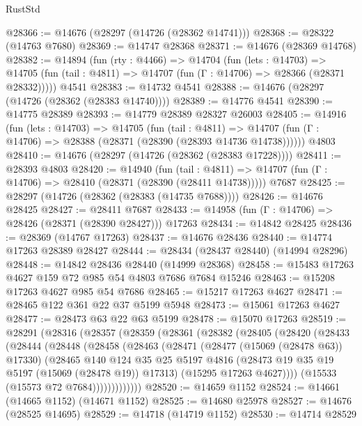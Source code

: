 \begin{lexlean}{RustStd}
\begin{coremodule}
@28366 := @14676 (@28297 (@14726 (@28362 @14741)))
@28368 := @28322 (@14763 @7680)
@28369 := @14747 @28368
@28371 := @14676 (@28369 @14768)
@28382 := @14894
    (fun (rty : @4466) =>
    @14704
      (fun (lets : @14703) =>
      @14705 (fun (tail : @4811) => @14707 (fun (Γ : @14706) => @28366 (@28371 @28332)))))
    @4541
@28383 := @14732 @4541
@28388 := @14676 (@28297 (@14726 (@28362 (@28383 @14740))))
@28389 := @14776 @4541
@28390 := @14775 @28389
@28393 := @14779 @28389 @28327 @26003
@28405 := @14916
    (fun (lets : @14703) =>
    @14705
      (fun (tail : @4811) =>
      @14707 (fun (Γ : @14706) => @28388 (@28371 (@28390 (@28393 @14736 @14738))))))
    @4803
@28410 := @14676 (@28297 (@14726 (@28362 (@28383 @17228))))
@28411 := @28393 @4803
@28420 := @14940
    (fun (tail : @4811) => @14707 (fun (Γ : @14706) => @28410 (@28371 (@28390 (@28411 @14738)))))
    @7687
@28425 := @28297 (@14726 (@28362 (@28383 (@14735 @7688))))
@28426 := @14676 @28425
@28427 := @28411 @7687
@28433 := @14958 (fun (Γ : @14706) => @28426 (@28371 (@28390 @28427))) @17263
@28434 := @14842 @28425
@28436 := @28369 (@14767 @17263)
@28437 := @14676 @28436
@28440 := @14774 @17263 @28389 @28427
@28444 := @28434 (@28437 @28440) (@14994 @28296)
@28448 := @14842 @28436 @28440 (@14999 @28368)
@28458 := @15483 @17263 @4627 @159 @72 @985 @54 @4803 @7686 @7684 @15246
@28463 := @15208 @17263 @4627 @985 @54 @7686
@28465 := @15217 @17263 @4627
@28471 := @28465 @122 @361 @22 @37 @5199 @5948
@28473 := @15061 @17263 @4627
@28477 := @28473 @63 @22 @63 @5199
@28478 := @15070 @17263
@28519 := @28291
    (@28316
      (@28357
        (@28359
          (@28361
            (@28382
              (@28405
                (@28420
                  (@28433
                    (@28444
                      (@28448
                        (@28458
                          (@28463
                            (@28471
                              (@28477 (@15069 (@28478 @63)) @17330)
                              (@28465
                                @140
                                @124
                                @35
                                @25
                                @5197
                                @4816
                                (@28473 @19 @35 @19 @5197 (@15069 (@28478 @19)) @17313)
                                (@15295 @17263 @4627))))
                          (@15533 (@15573 @72 @7684)))))))))))))
@28520 := @14659 @1152
@28524 := @14661 (@14665 @1152) (@14671 @1152)
@28525 := @14680 @25978
@28527 := @14676 (@28525 @14695)
@28529 := @14718 (@14719 @1152)
@28530 := @14714 @28529

\end{coremodule}
\end{lexlean}
